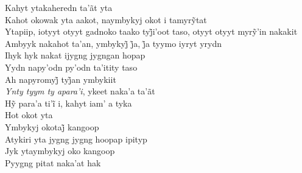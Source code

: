 \begin{linenumbers}\begingroup\raggedright

\noindent   Kahyt ytakaheredn ta'ãt yta\\
  Kahot okowak yta aakot, naymbykyj okot i tamyrỹtat\\
  Ytapiip, iotyyt otyyt gadnoko taako tyj̃i’oot taso, otyyt otyyt myrỹ’in nakakit\\
  Ambyyk nakahot ta’an, ymbykyj̃ j̃a, j̃a tyymo iyryt yrydn\\
  Ihyk hyk nakat ijygng jygngan hopap\\
  Yydn napy'odn py'odn ta'itity taso\\
  Ah napyromyj̃ tyj̃an ymbykiit\\
  \emph{Ynty tyym ty apara'i}, ykeet naka'a ta'ãt\\
  Hỹ para’a ti’ĩ i, kahyt iam’ a tyka\\
  Hot okot yta\\
  Ymbykyj okotaj̃ kangoop\\
  Atykiri yta jygng jygng hoopap ipityp\\
  Jyk ytaymbykyj oko kangoop\\
  Pyygng pitat naka'at hak

\end{linenumbers}\endgroup

\bigskip

